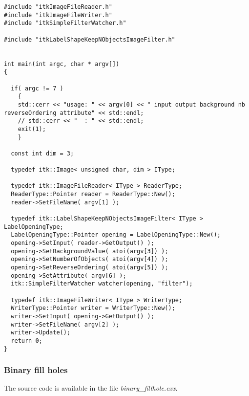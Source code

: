 \documentclass{InsightArticle}
\begin{document}
\small \begin{verbatim}
#include "itkImageFileReader.h"
#include "itkImageFileWriter.h"
#include "itkSimpleFilterWatcher.h"

#include "itkLabelShapeKeepNObjectsImageFilter.h"


int main(int argc, char * argv[])
{

  if( argc != 7 )
    {
    std::cerr << "usage: " << argv[0] << " input output background nb reverseOrdering attribute" << std::endl;
    // std::cerr << "  : " << std::endl;
    exit(1);
    }

  const int dim = 3;

  typedef itk::Image< unsigned char, dim > IType;

  typedef itk::ImageFileReader< IType > ReaderType;
  ReaderType::Pointer reader = ReaderType::New();
  reader->SetFileName( argv[1] );

  typedef itk::LabelShapeKeepNObjectsImageFilter< IType > LabelOpeningType;
  LabelOpeningType::Pointer opening = LabelOpeningType::New();
  opening->SetInput( reader->GetOutput() );
  opening->SetBackgroundValue( atoi(argv[3]) );
  opening->SetNumberOfObjects( atoi(argv[4]) );
  opening->SetReverseOrdering( atoi(argv[5]) );
  opening->SetAttribute( argv[6] );
  itk::SimpleFilterWatcher watcher(opening, "filter");

  typedef itk::ImageFileWriter< IType > WriterType;
  WriterType::Pointer writer = WriterType::New();
  writer->SetInput( opening->GetOutput() );
  writer->SetFileName( argv[2] );
  writer->Update();
  return 0;
}
\end{verbatim} \normalsize

\subsubsection{Binary fill holes}

The source code is available in the file {\em binary\_fillhole.cxx}.
\end{document}
